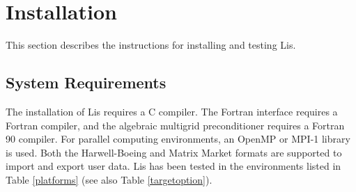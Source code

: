 \documentclass[a4paper]{article}
\begin{document}
\newpage
\section{Installation}
This section describes the instructions for installing and testing Lis. 

\subsection{System Requirements}
The installation of Lis requires a C compiler. The Fortran interface
requires a Fortran compiler, and the
algebraic multigrid preconditioner requires a Fortran 90 compiler.
For parallel computing environments, an OpenMP\cite{OpenMP} or 
MPI-1\cite{MPI} library is used\cite{kota1,kota2}.
Both the Harwell-Boeing\cite{duff92} and 
Matrix Market\cite{matrixmarket} formats are supported to import and
export user data. 
Lis has been tested in the environments listed in Table \ref{platforms}
(see also Table \ref{targetoption}). 
\end{document}
